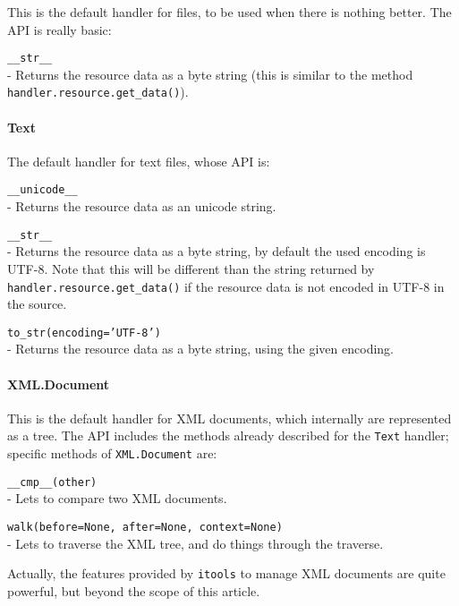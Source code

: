 This is the default handler for files, to be used when there is nothing
better. The API is really basic:

\begin{api}
  {\tt \_\_str\_\_}\\
  - Returns the resource data as a byte string (this is similar to the
    method {\tt handler.resource.get\_data()}).
\end{api}

\paragraph{Text}

The default handler for text files, whose API is:

\begin{api}
  {\tt \_\_unicode\_\_}\\
  - Returns the resource data as an unicode string.

  {\tt \_\_str\_\_}\\
  - Returns the resource data as a byte string, by default the used
  encoding is UTF-8. Note that this will be different than the string
  returned by {\tt handler.resource.get\_data()} if the resource data
  is not encoded in UTF-8 in the source.

  {\tt to\_str(encoding='UTF-8')}\\
  - Returns the resource data as a byte string, using the given encoding.
\end{api}

\paragraph{XML.Document}

This is the default handler for XML documents, which internally are
represented as a tree. The API includes the methods already described
for the {\tt Text} handler; specific methods of {\tt XML.Document} are:

\begin{api}
  {\tt \_\_cmp\_\_(other)}\\
  - Lets to compare two XML documents.

  {\tt walk(before=None, after=None, context=None)}\\
  - Lets to traverse the XML tree, and do things through the traverse.
\end{api}

Actually, the features provided by {\tt itools} to manage XML documents
are quite powerful, but beyond the scope of this article.

